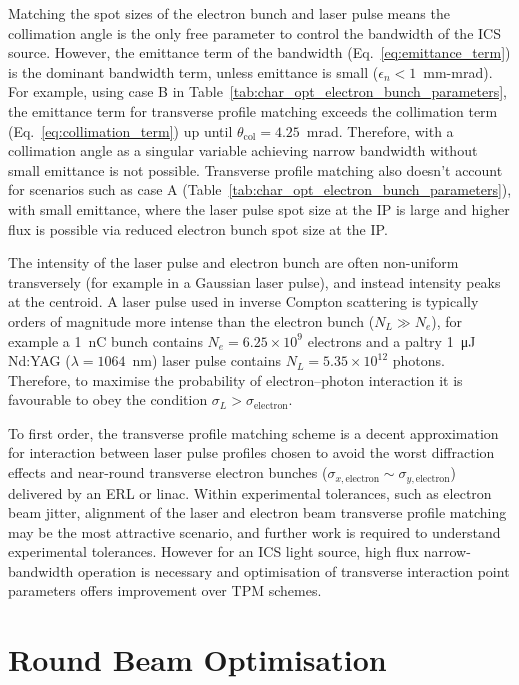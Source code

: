 \documentclass[../main.tex]{subfiles}
\begin{document}
Matching the spot sizes of the electron bunch and laser pulse means the collimation angle is the only free parameter to control the bandwidth of the ICS source. However, the emittance term of the bandwidth (Eq.~\ref{eq:emittance_term}) is the dominant bandwidth term, unless emittance is small ($\epsilon_{n} < 1$~\si{\milli\meter}-\si{\milli\radian}). For example, using case B in Table~\ref{tab:char_opt_electron_bunch_parameters}, the emittance term for transverse profile matching exceeds the collimation term (Eq.~\ref{eq:collimation_term}) up until $\theta_{\mathrm{col}} = 4.25$~\si{\milli\radian}. Therefore, with a collimation angle as a singular variable achieving narrow bandwidth without small emittance is not possible. Transverse profile matching also doesn't account for scenarios such as case A (Table~\ref{tab:char_opt_electron_bunch_parameters}), with small emittance, where the laser pulse spot size at the IP is large and higher flux is possible via reduced electron bunch spot size at the IP. 

The intensity of the laser pulse and electron bunch are often non-uniform transversely (for example in a Gaussian laser pulse), and instead intensity peaks at the centroid. A laser pulse used in inverse Compton scattering is typically orders of magnitude more intense than the electron bunch ($N_{L} \gg N_{e}$), for example a 1~\si{\nano\coulomb} bunch contains $N_{e} = 6.25\times 10^{9}$ electrons and a paltry 1~\si{\micro\joule} Nd:YAG ($\lambda = 1064$~\si{\nano\meter}) laser pulse contains $N_{L} = 5.35\times 10^{12}$ photons. Therefore, to maximise the probability of electron--photon interaction it is favourable to obey the condition $\sigma_{L} > \sigma_{\mathrm{electron}}$.

To first order, the transverse profile matching scheme is a decent approximation for interaction between laser pulse profiles chosen to avoid the worst diffraction effects and near-round transverse electron bunches  ($\sigma_{x,\mathrm{electron}}\sim\sigma_{y,\mathrm{electron}}$) delivered by an ERL or linac. Within experimental tolerances, such as electron beam jitter, alignment of the laser and electron beam transverse profile matching may be the most attractive scenario, and further work is required to understand experimental tolerances. However for an ICS light source, high flux narrow-bandwidth operation is necessary and optimisation of transverse interaction point parameters offers improvement over TPM schemes. 

\section{Round Beam Optimisation}
\label{sec:RB_optimisation}
\end{document}
